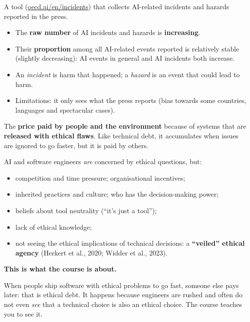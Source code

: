 \documentclass[11pt,a4paper,openany]{book}
\begin{document}
\begin{exbox}[title={The OECD AI Incidents and Hazards Monitor (AIM)}]
A tool (\href{https://oecd.ai/en/incidents}{oecd.ai/en/incidents}) that collects AI-related
incidents and hazards reported in the press.
\begin{itemize}
  \item The \textbf{raw number} of AI incidents and hazards is \textbf{increasing}.
  \item Their \textbf{proportion} among all AI-related events reported is relatively stable
        (slightly decreasing): AI events in general and AI incidents both increase.
  \item An \emph{incident} is harm that happened; a \emph{hazard} is an event that could lead
        to harm.
  \item Limitations: it only sees what the press reports (bias towards some countries,
        languages and spectacular cases).
\end{itemize}
\end{exbox}

\begin{defnbox}[title={Ethical debt (Petrozzino, 2021)}]
The \textbf{price paid by people and the environment} because of systems that are
\textbf{released with ethical flaws}. Like technical debt, it accumulates when issues are
ignored to go faster, but it is paid by others.
\end{defnbox}

\begin{propbox}[title={Where does ethical debt come from?}]
AI and software engineers \emph{are} concerned by ethical questions, but:
\begin{itemize}
  \item competition and time pressure; organisational incentives;
  \item inherited practices and culture; who has the decision-making power;
  \item beliefs about tool neutrality (``it's just a tool'');
  \item lack of ethical knowledge;
  \item not seeing the ethical implications of technical decisions: a \textbf{``veiled''
        ethical agency} (Herkert et al., 2020; Widder et al., 2023).
\end{itemize}
\textbf{This is what the course is about.}
\end{propbox}

\begin{goatbox}
When people ship software with ethical problems to go fast, someone else pays later: that is
ethical debt. It happens because engineers are rushed and often do not even \emph{see} that a
technical choice is also an ethical choice. The course teaches you to see it.
\end{goatbox}
\end{document}
